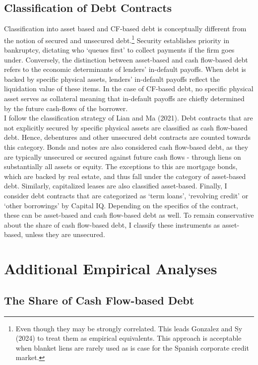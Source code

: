 \documentclass[12pt]{article}
\begin{document}
\subsection{Classification of Debt Contracts \label{sec:classification}}
Classification into asset based and CF-based debt is conceptually different from the notion of secured and unsecured debt.\footnote{Even though they may be strongly correlated. This leads Gonzalez and Sy (2024) to treat them as empirical equivalents. This approach is acceptable when blanket liens are rarely used  as is case for the Spanish corporate credit market.} Security establishes priority in bankruptcy, dictating who `queues first' to collect payments if the firm goes under. Conversely, the distinction between asset-based and cash flow-based debt refers to the economic determinants of lenders' in-default payoffs. When debt is backed by specific physical assets, lenders' in-default payoffs reflect the liquidation value of these items. In the case of CF-based debt, no specific physical asset serves as collateral meaning that in-default payoffs are chiefly determined by the future cash-flows of the borrower. \vspace{3mm} \\
I follow the classification strategy of Lian and Ma (2021). Debt contracts that are not explicitly secured by specific physical assets are classified as cash flow-based debt. Hence, debentures and other unsecured debt contracts are counted towards this category. Bonds and notes are also considered cash flow-based debt, as they are typically unsecured or secured against future cash flows - through liens on substantially all assets or equity. The exceptions to this are mortgage bonds, which are backed by real estate, and thus fall under the category of asset-based debt. Similarly, capitalized leases are also classified asset-based. Finally, I consider debt contracts that are categorized as `term loans', `revolving credit' or `other borrowings' by Capital IQ. Depending on the specifics of the contract, these can be asset-based and cash flow-based debt as well. To remain conservative about the share of cash flow-based debt, I classify these instruments as asset-based, unless they are unsecured.  

\section{Additional Empirical Analyses}
\subsection{The Share of Cash Flow-based Debt \label{sec:aggCFshare}}
\end{document}
